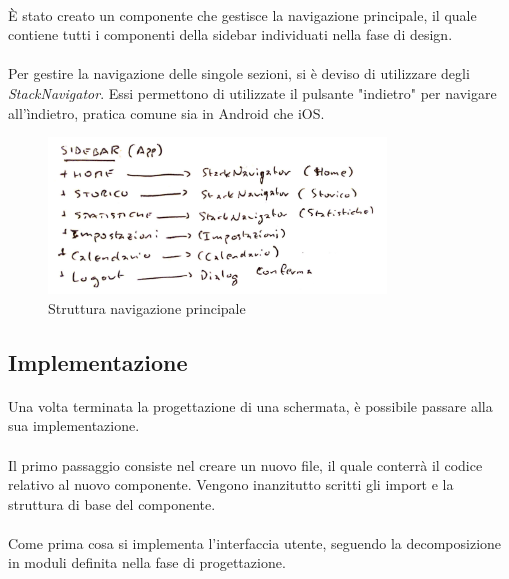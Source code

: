 \documentclass[11pt,a4paper,english]{article}
\begin{document}
\paragraph{} È stato creato un componente che gestisce la navigazione principale, il quale contiene tutti i componenti della sidebar individuati nella fase di design.

\paragraph{} Per gestire la navigazione delle singole sezioni, si è deviso di utilizzare degli \emph{StackNavigator}. Essi permettono di utilizzate il pulsante "indietro" per navigare all'ìndietro, pratica comune sia in Android che iOS.  

\begin{figure}[H]
    \centering
    \includegraphics[width=0.8\textwidth]{img/navigation.pdf}
    \caption{Struttura navigazione principale}
\end{figure}



\subsection{Implementazione}

\paragraph{} Una volta terminata la progettazione di una schermata, è possibile passare alla sua implementazione. 

\paragraph{} Il primo passaggio consiste nel creare un nuovo file, il quale conterrà il codice relativo al nuovo componente. Vengono inanzitutto scritti gli import e la struttura di base del componente.

\paragraph{} Come prima cosa si implementa l'interfaccia utente, seguendo la decomposizione in moduli definita nella fase di progettazione. 
\end{document}
